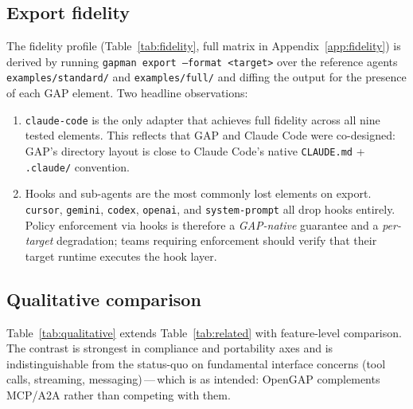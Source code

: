 \documentclass[11pt,a4paper]{article}
\begin{document}
\subsection{Export fidelity}

The fidelity profile (Table~\ref{tab:fidelity}, full matrix in
Appendix~\ref{app:fidelity}) is derived by running
\texttt{gapman export --format <target>} over the reference agents
\texttt{examples/standard/} and \texttt{examples/full/} and diffing the output for the
presence of each GAP element. Two headline observations:

\begin{enumerate}
  \item \texttt{claude-code} is the only adapter that achieves full fidelity across
  all nine tested elements. This reflects that GAP and Claude Code were co-designed:
  GAP's directory layout is close to Claude Code's native \texttt{CLAUDE.md} +
  \texttt{.claude/} convention.
  \item Hooks and sub-agents are the most commonly lost elements on export.
  \texttt{cursor}, \texttt{gemini}, \texttt{codex}, \texttt{openai}, and
  \texttt{system-prompt} all drop hooks entirely. Policy enforcement via hooks is
  therefore a \emph{GAP-native} guarantee and a \emph{per-target} degradation; teams
  requiring enforcement should verify that their target runtime executes the hook
  layer.
\end{enumerate}

\subsection{Qualitative comparison}

Table~\ref{tab:qualitative} extends Table~\ref{tab:related} with feature-level
comparison. The contrast is strongest in compliance and portability axes and is
indistinguishable from the status-quo on fundamental interface concerns (tool calls,
streaming, messaging)\,---\,which is as intended: OpenGAP complements MCP/A2A rather
than competing with them.
\end{document}
